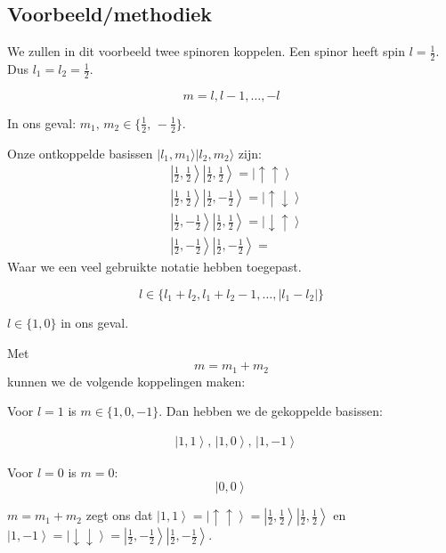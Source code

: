 \subsection{Voorbeeld/methodiek}

We zullen in dit voorbeeld twee spinoren koppelen.
Een spinor heeft spin \(l = \frac{1}{2}\).
Dus \(l_1 = l_2 = \frac{1}{2}\).

\[m = l, l-1, \dots, -l\]

In ons geval: \(m_1, \, m_2 \in \{\frac{1}{2} , \, -\frac{1}{2}\}  \).

Onze ontkoppelde basissen \(| l_1,m_1\rangle | l_2,m_2 \rangle\) zijn:
\[\begin{aligned}
&\left| \frac{1}{2}, \frac{1}{2} \right\rangle \left| \frac{1}{2}, \frac{1}{2} \right\rangle = \left|\uparrow\uparrow\right\rangle \\
&\left| \frac{1}{2}, \frac{1}{2} \right\rangle \left| \frac{1}{2}, -\frac{1}{2} \right\rangle = \left|\uparrow\downarrow\right\rangle \\
&\left| \frac{1}{2}, -\frac{1}{2} \right\rangle \left| \frac{1}{2}, \frac{1}{2} \right\rangle = \left|\downarrow\uparrow\right\rangle \\
&\left| \frac{1}{2}, -\frac{1}{2} \right\rangle \left| \frac{1}{2}, -\frac{1}{2} \right\rangle =
\end{aligned}\]
Waar we een veel gebruikte notatie hebben toegepast.


\[l \in \{l_1 + l_2, l_1 + l_2 - 1, \dots, |l_1 - l_2|\} \]

\(l \in \{1, 0\}\) in ons geval.

Met
\[ m = m_1 + m_2\]
kunnen we de volgende koppelingen maken:

Voor \(l=1\) is \(m \in \{1, 0, -1\}\).
Dan hebben we de gekoppelde basissen:

\[\begin{aligned}
&\left| 1, 1 \right\rangle
,\,
\left| 1, 0 \right\rangle
,\,
\left| 1, -1 \right\rangle
\end{aligned}\]

Voor \(l=0\) is \(m = 0\):
\[\left| 0, 0 \right\rangle  \]


\( m = m_1 + m_2\) zegt ons dat \(\left| 1, 1 \right\rangle = \left|\uparrow\uparrow\right\rangle = \left|\frac{1}{2}, \frac{1}{2} \right\rangle \left|\frac{1}{2}, \frac{1}{2} \right\rangle\) en \(\left| 1, -1 \right\rangle = \left|\downarrow\downarrow\right\rangle = \left|\frac{1}{2}, -\frac{1}{2} \right\rangle \left|\frac{1}{2}, -\frac{1}{2} \right\rangle\).

